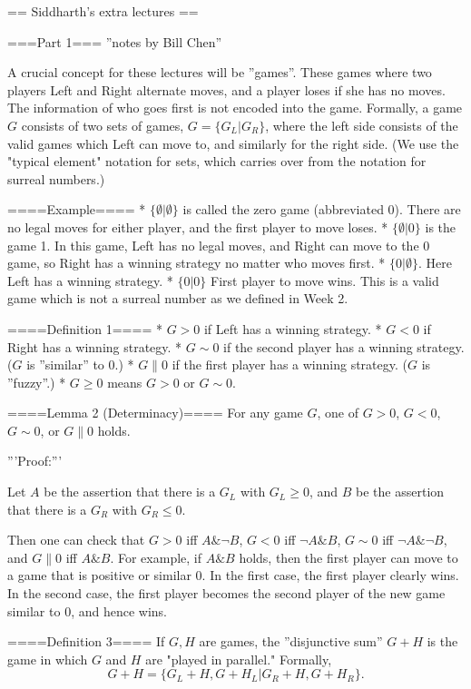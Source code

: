 == Siddharth's extra lectures ==

===Part 1===
''notes by Bill Chen''

A crucial concept for these lectures will be ''games''. These games where two players Left and Right alternate moves, and a player loses if she has no moves. The information of who goes first is not encoded into the game. Formally, a game $G$ consists of two sets of games, $G=\{G_L|G_R\}$, where the left side consists of the valid games which Left can move to, and similarly for the right side. (We use the "typical element" notation for sets, which carries over from the notation for surreal numbers.)

====Example====
* $\{\emptyset|\emptyset\}$ is called the zero game (abbreviated 0). There are no legal moves for either player, and the first player to move loses.
* $\{\emptyset|0\}$ is the game 1. In this game, Left has no legal moves, and Right can move to the 0 game, so Right has a winning strategy no matter who moves first.
* $\{0|\emptyset\}$. Here Left has a winning strategy.
* $\{0|0\}$ First player to move wins. This is a valid game which is not a surreal number as we defined in Week 2.

====Definition 1====
* $G>0$ if Left has a winning strategy.
* $G<0$ if Right has a winning strategy.
* $G\sim 0$ if the second player has a winning strategy. ($G$ is ''similar'' to $0$.)
* $G\parallel 0$ if the first player has a winning strategy. ($G$ is ''fuzzy''.)
* $G\ge 0$ means $G>0$ or $G\sim 0$.

====Lemma 2 (Determinacy)====
For any game $G$, one of $G>0$, $G<0$, $G\sim 0$, or $G\parallel 0$ holds.

'''Proof:'''

Let $A$ be the assertion that there is a $G_L$ with $G_L\ge 0$, and $B$ be the assertion that there is a $G_R$ with $G_R\le 0$.

Then one can check that $G>0$ iff $A\& \neg B$, $G<0$ iff $\neg A \& B$, $G\sim 0$ iff $\neg A \& \neg B$, and $G\parallel 0$ iff $A\& B$. For example, if $A \& B$ holds, then the first player can move to a game that is positive or similar $0$. In the first case, the first player clearly wins. In the second case, the first player becomes the second player of the new game similar to $0$, and hence wins.

====Definition 3====
If $G,H$ are games, the ''disjunctive sum'' $G+H$ is the game in which $G$ and $H$ are "played in parallel." Formally,
$$G+H=\{G_L+H,G+H_L|G_R+H, G+H_R\}.$$

